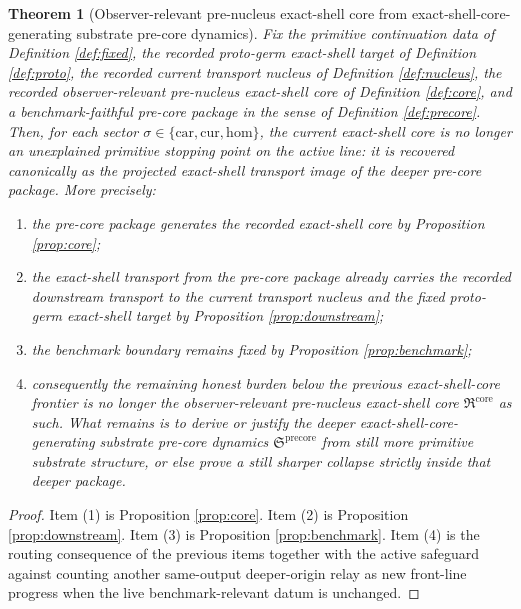 \documentclass[11pt]{article}
\newcommand{\Car}{\mathrm{car}}
\newcommand{\Cur}{\mathrm{cur}}
\newcommand{\Hom}{\mathrm{hom}}
\newcommand{\PreNucCore}{\mathfrak R^{\mathrm{core}}}
\newcommand{\PreCorePackage}{\mathfrak S^{\mathrm{precore}}}
\newtheorem{theorem}{Theorem}
\begin{document}
\begin{theorem}[Observer-relevant pre-nucleus exact-shell core from exact-shell-core-generating substrate pre-core dynamics]
\label{thm:main}
Fix the primitive continuation data of Definition \ref{def:fixed}, the recorded proto-germ exact-shell target of Definition \ref{def:proto}, the recorded current transport nucleus of Definition \ref{def:nucleus}, the recorded observer-relevant pre-nucleus exact-shell core of Definition \ref{def:core}, and a benchmark-faithful pre-core package in the sense of Definition \ref{def:precore}. Then, for each sector \(\sigma\in\{\Car,\Cur,\Hom\}\), the current exact-shell core is no longer an unexplained primitive stopping point on the active line: it is recovered canonically as the projected exact-shell transport image of the deeper pre-core package. More precisely:
\begin{enumerate}
    \item the pre-core package generates the recorded exact-shell core by Proposition \ref{prop:core};
    \item the exact-shell transport from the pre-core package already carries the recorded downstream transport to the current transport nucleus and the fixed proto-germ exact-shell target by Proposition \ref{prop:downstream};
    \item the benchmark boundary remains fixed by Proposition \ref{prop:benchmark};
    \item consequently the remaining honest burden below the previous exact-shell-core frontier is no longer the observer-relevant pre-nucleus exact-shell core \(\PreNucCore\) as such. What remains is to derive or justify the deeper exact-shell-core-generating substrate pre-core dynamics \(\PreCorePackage\) from still more primitive substrate structure, or else prove a still sharper collapse strictly inside that deeper package.
\end{enumerate}
\end{theorem}

\begin{proof}
Item (1) is Proposition \ref{prop:core}. Item (2) is Proposition \ref{prop:downstream}. Item (3) is Proposition \ref{prop:benchmark}. Item (4) is the routing consequence of the previous items together with the active safeguard against counting another same-output deeper-origin relay as new front-line progress when the live benchmark-relevant datum is unchanged.
\end{proof}
\end{document}

